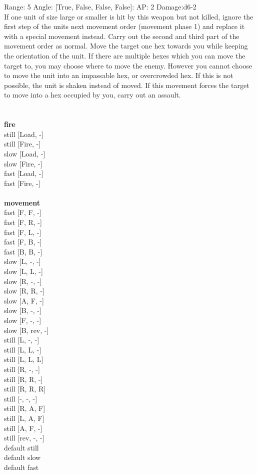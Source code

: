 Range: 5  Angle: [True, False, False, False]: AP: 2 Damage:d6-2 \\
If one unit of size large or smaller is hit by this weapon but not killed, ignore the first step of the units next movement order (movement phase 1) and replace it with a special movement instead. Carry out the second and third part of the movement order as normal. Move the target one hex towards you while keeping the orientation of the unit. If there are multiple hexes which you can move the target to, you may choose where to move the enemy. However you cannot choose to move the unit into an impassable hex, or overcrowded hex. If this is not possible, the unit is shaken instead of moved. If this movement forces the target to move into a hex occupied by you, carry out an assault.\\ 




 
\ \\



\ \\ {\bf fire } \\
still [Load, -] \\
still [Fire, -] \\
slow [Load, -] \\
slow [Fire, -] \\
fast [Load, -] \\
fast [Fire, -] \\
\ \\ {\bf movement } \\
fast [F, F, -] \\
fast [F, R, -] \\
fast [F, L, -] \\
fast [F, B, -] \\
fast [B, B, -] \\
slow [L, -, -] \\
slow [L, L, -] \\
slow [R, -, -] \\
slow [R, R, -] \\
slow [A, F, -] \\
slow [B, -, -] \\
slow [F, -, -] \\
slow [B, rev, -] \\
still [L, -, -] \\
still [L, L, -] \\
still [L, L, L] \\
still [R, -, -] \\
still [R, R, -] \\
still [R, R, R] \\
still [-, -, -] \\
still [R, A, F] \\
still [L, A, F] \\
still [A, F, -] \\
still [rev, -, -] \\
default still \\
default slow \\
default fast \\


